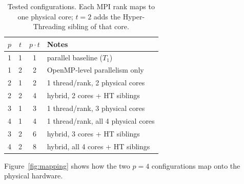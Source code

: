 \documentclass[12pt,a4paper]{article}
\begin{document}
\begin{table}[H]
  \centering
  \caption{Tested configurations. Each MPI rank maps to one physical core;
           $t=2$ adds the Hyper-Threading sibling of that core.}
  \begin{tabular}{cccl}
    \toprule
    $p$ & $t$ & $p \cdot t$ & Notes \\
    \midrule
    1 & 1 & 1 & parallel baseline ($T_1$) \\
    1 & 2 & 2 & OpenMP-level parallelism only \\
    2 & 1 & 2 & 1 thread/rank, 2 physical cores \\
    2 & 2 & 4 & hybrid, 2 cores + HT siblings \\
    3 & 1 & 3 & 1 thread/rank, 3 physical cores \\
    4 & 1 & 4 & 1 thread/rank, all 4 physical cores \\
    3 & 2 & 6 & hybrid, 3 cores + HT siblings \\
    4 & 2 & 8 & hybrid, all 4 cores + HT siblings \\
    \bottomrule
  \end{tabular}
\end{table}

Figure~\ref{fig:mapping} shows how the two $p=4$ configurations
map onto the physical hardware.
\end{document}

